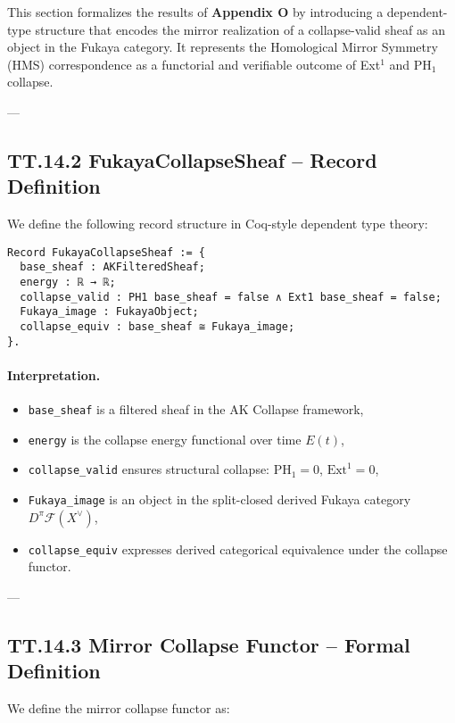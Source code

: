 \documentclass[11pt]{article}
\begin{document}
This section formalizes the results of \textbf{Appendix O} by introducing a dependent-type structure  
that encodes the mirror realization of a collapse-valid sheaf as an object in the Fukaya category.  
It represents the Homological Mirror Symmetry (HMS) correspondence as a functorial and verifiable outcome of Ext$^1$ and PH$_1$ collapse.

---

\subsection*{TT.14.2 FukayaCollapseSheaf – Record Definition}

We define the following record structure in Coq-style dependent type theory:

\begin{verbatim}
Record FukayaCollapseSheaf := {
  base_sheaf : AKFilteredSheaf;
  energy : ℝ → ℝ;
  collapse_valid : PH1 base_sheaf = false ∧ Ext1 base_sheaf = false;
  Fukaya_image : FukayaObject;
  collapse_equiv : base_sheaf ≅ Fukaya_image;
}.
\end{verbatim}

\paragraph{Interpretation.}
\begin{itemize}
  \item \texttt{base\_sheaf} is a filtered sheaf in the AK Collapse framework,
  \item \texttt{energy} is the collapse energy functional over time \( E(t) \),
  \item \texttt{collapse\_valid} ensures structural collapse: \( \mathrm{PH}_1 = 0 \), \( \mathrm{Ext}^1 = 0 \),
  \item \texttt{Fukaya\_image} is an object in the split-closed derived Fukaya category \( D^\pi\mathcal{F}(X^\vee) \),
  \item \texttt{collapse\_equiv} expresses derived categorical equivalence under the collapse functor.
\end{itemize}

---

\subsection*{TT.14.3 Mirror Collapse Functor – Formal Definition}

We define the mirror collapse functor as:
\end{document}
